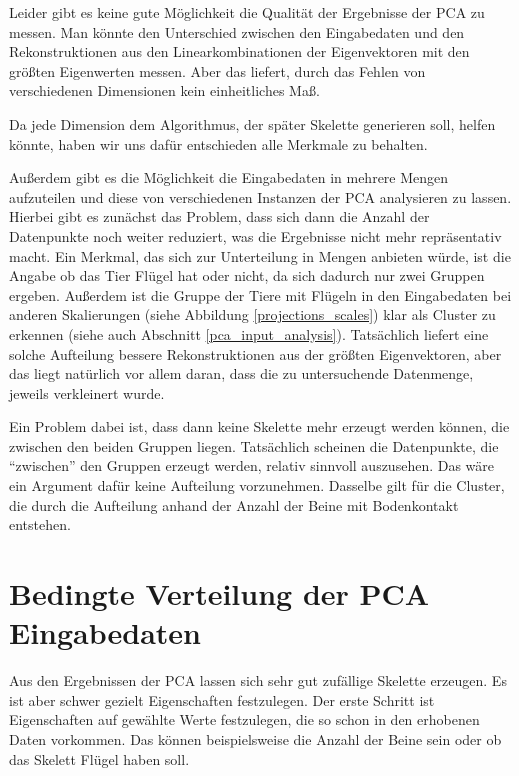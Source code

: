  Leider gibt es keine gute Möglichkeit die Qualität der Ergebnisse der PCA zu messen. Man könnte den Unterschied zwischen den Eingabedaten und den Rekonstruktionen aus den Linearkombinationen der Eigenvektoren mit den größten Eigenwerten messen. Aber das liefert, durch das Fehlen von verschiedenen Dimensionen kein einheitliches Maß.
 
 Da jede Dimension dem Algorithmus, der später Skelette generieren soll, helfen könnte, haben wir uns dafür entschieden alle Merkmale zu behalten.
 
 Außerdem gibt es die Möglichkeit die Eingabedaten in mehrere Mengen aufzuteilen und diese von verschiedenen Instanzen der PCA analysieren zu lassen. Hierbei gibt es zunächst das Problem, dass sich dann die Anzahl der Datenpunkte noch weiter reduziert, was die Ergebnisse nicht mehr repräsentativ macht.
 Ein Merkmal, das sich zur Unterteilung in Mengen anbieten würde, ist die Angabe ob das Tier Flügel hat oder nicht, da sich dadurch nur zwei Gruppen ergeben. Außerdem ist die Gruppe der Tiere mit Flügeln in den Eingabedaten bei anderen Skalierungen (siehe Abbildung \ref{projections_scales}) klar als Cluster zu erkennen (siehe auch Abschnitt \ref{pca_input_analysis}). Tatsächlich liefert eine solche Aufteilung bessere Rekonstruktionen aus der größten Eigenvektoren, aber das liegt natürlich vor allem daran, dass die zu untersuchende Datenmenge, jeweils verkleinert wurde.
 
 Ein Problem dabei ist, dass dann keine Skelette mehr erzeugt werden können, die zwischen den beiden Gruppen liegen. Tatsächlich scheinen die Datenpunkte, die "`zwischen"' den Gruppen erzeugt werden, relativ sinnvoll auszusehen.
 Das wäre ein Argument dafür keine Aufteilung vorzunehmen. Dasselbe gilt für die Cluster, die durch die Aufteilung anhand der Anzahl der Beine mit Bodenkontakt entstehen.
 
 
 \section{Bedingte Verteilung der PCA Eingabedaten}
 
 
 Aus den Ergebnissen der PCA lassen sich sehr gut zufällige Skelette erzeugen. Es ist aber schwer gezielt Eigenschaften festzulegen.
 Der erste Schritt ist Eigenschaften auf gewählte Werte festzulegen, die so schon in den erhobenen Daten vorkommen. Das können beispielsweise die Anzahl der Beine sein oder ob das Skelett Flügel haben soll.
 
